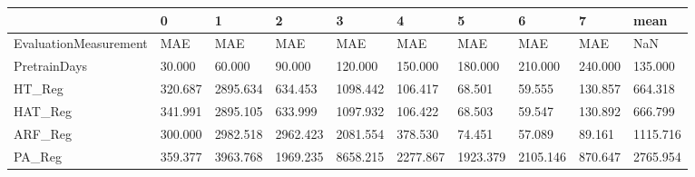 \begin{tabular}{llllllllll}
\toprule
{} &       0 &        1 &        2 &        3 &        4 &        5 &        6 &       7 &     mean \\
\midrule
EvaluationMeasurement &     MAE &      MAE &      MAE &      MAE &      MAE &      MAE &      MAE &     MAE &      NaN \\
PretrainDays          &  30.000 &   60.000 &   90.000 &  120.000 &  150.000 &  180.000 &  210.000 & 240.000 &  135.000 \\
HT\_Reg                & 320.687 & 2895.634 &  634.453 & 1098.442 &  106.417 &   68.501 &   59.555 & 130.857 &  664.318 \\
HAT\_Reg               & 341.991 & 2895.105 &  633.999 & 1097.932 &  106.422 &   68.503 &   59.547 & 130.892 &  666.799 \\
ARF\_Reg               & 300.000 & 2982.518 & 2962.423 & 2081.554 &  378.530 &   74.451 &   57.089 &  89.161 & 1115.716 \\
PA\_Reg                & 359.377 & 3963.768 & 1969.235 & 8658.215 & 2277.867 & 1923.379 & 2105.146 & 870.647 & 2765.954 \\
\bottomrule
\end{tabular}
